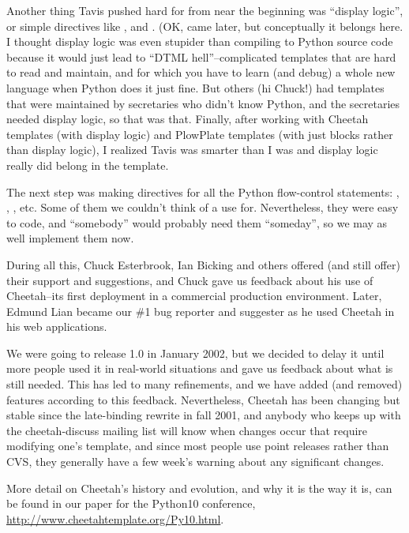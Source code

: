 Another thing Tavis pushed hard for from near the beginning was ``display
logic'', or simple directives like ,  and
.  (OK,  came later, but conceptually it belongs
here.  I thought display logic was even stupider than compiling to Python
source code because it would just lead to ``DTML hell''--complicated templates
that are hard to read and maintain, and for which you have to learn (and debug)
a whole new language when Python does it just fine.  But others (hi Chuck!) had
templates that were maintained by secretaries who didn't know Python, and the
secretaries needed display logic, so that was that.  Finally, after working
with Cheetah templates (with display logic) and PlowPlate templates (with just
blocks rather than display logic), I realized Tavis was smarter than I was and
display logic really did belong in the template.

The next step was making directives for all the Python flow-control
statements: , , , etc.  Some of
them we couldn't think of a use for.  Nevertheless, they were easy to code,
and ``somebody'' would probably need them ``someday'', so we may as well
implement them now.

During all this, Chuck Esterbrook, Ian Bicking and others offered (and still
offer) their support and suggestions, and Chuck gave us feedback about his use
of Cheetah--its first deployment in a commercial production environment.
Later, Edmund Lian became our \#1 bug reporter and suggester as he used Cheetah
in his web applications.


We were going to release 1.0 in January 2002, but we decided to delay it
until more people used it in real-world situations and gave us feedback
about what is still needed.  This has led to many refinements, and we have
added (and removed) features according to this feedback.  Nevertheless,
Cheetah has been changing but stable since the late-binding rewrite in 
fall 2001, and anybody who keeps up with the cheetah-discuss mailing list
will know when changes occur that require modifying one's template, and
since most people use point releases rather than CVS, they generally have
a few week's warning about any significant changes.

More detail on Cheetah's history and evolution, and why it is the way it is,
can be found in our paper for the Python10 conference,
\url{http://www.cheetahtemplate.org/Py10.html}.



